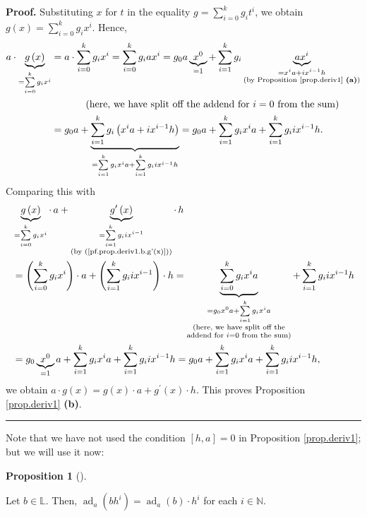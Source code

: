 \documentclass[numbers=enddot,12pt,final,onecolumn,notitlepage]{scrartcl}%
\theoremstyle{definition}
\newtheorem{prop}[theo]{Proposition}
\newenvironment{proposition}[1][]
{\begin{prop}[#1]\begin{leftbar}}
{\end{leftbar}\end{prop}}
\newenvironment{proof}[1][Proof]{\noindent\textbf{#1.} }{\ \rule{0.5em}{0.5em}}
\let\sumnonlimits\sum
\renewcommand{\sum}{\sumnonlimits\limits}
\begin{document}
\begin{proof}
Substituting $x$ for $t$ in the equality $g=\sum_{i=0}^{k}g_{i}t^{i}$, we
obtain $g\left(  x\right)  =\sum_{i=0}^{k}g_{i}x^{i}$. Hence,%
\begin{align*}
a\cdot\underbrace{g\left(  x\right)  }_{=\sum_{i=0}^{k}g_{i}x^{i}}  &
=a\cdot\sum_{i=0}^{k}g_{i}x^{i}=\sum_{i=0}^{k}g_{i}ax^{i}=g_{0}%
a\underbrace{x^{0}}_{=1}+\sum_{i=1}^{k}g_{i}\underbrace{ax^{i}}%
_{\substack{=x^{i}a+ix^{i-1}h\\\text{(by Proposition \ref{prop.deriv1}
\textbf{(a)})}}}\\
&  \ \ \ \ \ \ \ \ \ \ \left(  \text{here, we have split off the addend for
}i=0\text{ from the sum}\right) \\
&  =g_{0}a+\underbrace{\sum_{i=1}^{k}g_{i}\left(  x^{i}a+ix^{i-1}h\right)
}_{=\sum_{i=1}^{k}g_{i}x^{i}a+\sum_{i=1}^{k}g_{i}ix^{i-1}h}=g_{0}a+\sum
_{i=1}^{k}g_{i}x^{i}a+\sum_{i=1}^{k}g_{i}ix^{i-1}h.
\end{align*}
Comparing this with%
\begin{align*}
&  \underbrace{g\left(  x\right)  }_{=\sum_{i=0}^{k}g_{i}x^{i}}\cdot
\,a+\underbrace{g^{\prime}\left(  x\right)  }_{\substack{=\sum_{i=1}^{k}%
g_{i}ix^{i-1}\\\text{(by (\ref{pf.prop.deriv1.b.g'(x)}))}}}\cdot\, h\\
&  =\left(  \sum_{i=0}^{k}g_{i}x^{i}\right)  \cdot a+\left(  \sum_{i=1}%
^{k}g_{i}ix^{i-1}\right)  \cdot h=\underbrace{\sum_{i=0}^{k}g_{i}x^{i}%
a}_{\substack{=g_{0}x^{0}a+\sum_{i=1}^{k}g_{i}x^{i}a\\\text{(here, we have
split off the}\\\text{addend for }i=0\text{ from the sum)}}}+\sum_{i=1}%
^{k}g_{i}ix^{i-1}h\\
&  =g_{0}\underbrace{x^{0}}_{=1}a+\sum_{i=1}^{k}g_{i}x^{i}a+\sum_{i=1}%
^{k}g_{i}ix^{i-1}h=g_{0}a+\sum_{i=1}^{k}g_{i}x^{i}a+\sum_{i=1}^{k}%
g_{i}ix^{i-1}h,
\end{align*}
we obtain $a\cdot g\left(  x\right)  =g\left(  x\right)  \cdot a+g^{\prime
}\left(  x\right)  \cdot h$. This proves Proposition \ref{prop.deriv1}
\textbf{(b)}.
\end{proof}

Note that we have not used the condition $\left[  h,a\right]  =0$ in
Proposition \ref{prop.deriv1}; but we will use it now:

\begin{proposition}
\label{prop.deriv.triv-comm}Let $b\in\mathbb{L}$. Then, $\operatorname*{ad}%
\nolimits_{a}\left(  bh^{i}\right)  =\operatorname*{ad}\nolimits_{a}\left(
b\right)  \cdot h^{i}$ for each $i\in\mathbb{N}$.
\end{proposition}
\end{document}
